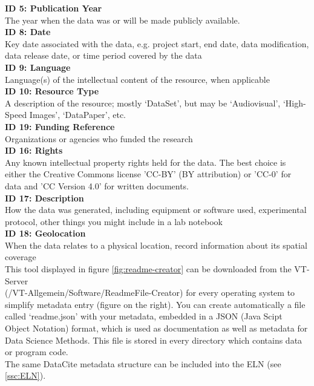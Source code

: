 \pagebreak
\noindent\textbf{ID 5: Publication Year} \\
The year when the data was or will be made publicly available. \\[6pt]
%
\textbf{ID 8: Date} \\
Key date associated with the data, e.g. project start, end date, data
modification, data release date, or time period covered by the data \\[6pt]
%
\textbf{ID 9: Language} \\
Language(s) of the intellectual content of the resource, when applicable \\[6pt]
%
\textbf{ID 10: Resource Type} \\
A description of the resource; mostly ‘DataSet’, but may be ‘Audiovisual’,
‘High-Speed Images’, ‘DataPaper’, etc. \\[6pt]
%
\textbf{ID 19: Funding Reference} \\
Organizations or agencies who funded the research \\[6pt]
%
\textbf{ID 16: Rights} \\
Any known intellectual property rights held for the data. The best choice is
either the Creative Commons license 'CC-BY' (BY attribution) or 'CC-0' for
data and 'CC Version 4.0' for written documents. \\[6pt]
%
\textbf{ID 17: Description} \\
How the data was generated, including equipment or software used, experimental
protocol, other things you might include in a lab notebook \\[6pt]
%
\textbf{ID 18: Geolocation} \\
When the data relates to a physical location, record information about its
spatial coverage \\[6pt]
%
This tool displayed in figure \ref{fig:readme-creator} can be downloaded
from the VT-Server \\ (/VT-Allgemein/Software/ReadmeFile-Creator) for every
operating system to simplify metadata entry (figure on the right). You can
create automatically a file called ‘readme.json’ with your metadata, embedded
in a JSON (Java Scipt Object Notation) format, which is used as documentation as
well as metadata for Data Science Methods. This file is stored in every
directory which contains data or program code.\\
%
The same DataCite metadata structure can be included into the ELN (see \ref{ssc:ELN}).
